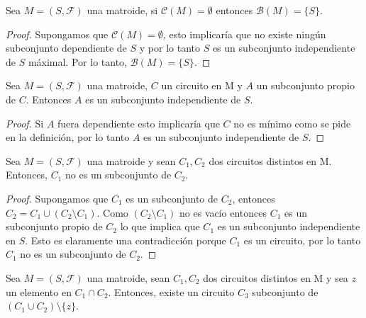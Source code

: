 \begin{cor}
Sea $M=(S,\mathcal{F})$ una matroide, si $\mathcal{C}(M)=\emptyset$ entonces $\mathcal{B}(M)=\{S\}$.
\end{cor}

\begin{proof}
Supongamos que $\mathcal{C}(M)=\emptyset$, esto implicaría que no existe ningún subconjunto dependiente de $S$ y por lo tanto $S$ es un subconjunto independiente de $S$ máximal. Por lo tanto, $\mathcal{B}(M)=\{S\}$.
\end{proof}

\begin{cor}
Sea $M=(S,\mathcal{F})$ una matroide, $C$ un circuito en M y $A$ un subconjunto propio de $C$. Entonces $A$ es un subconjunto independiente de $S$.
\end{cor}

\begin{proof}
Si $A$ fuera dependiente esto implicaría que $C$ no es mínimo como se pide en la definición, por lo tanto $A$ es un subconjunto independiente de $S$.
\end{proof}

\begin{cor} \label{C1}
Sea $M=(S,\mathcal{F})$ una matroide y sean $C_1, C_2$ dos circuitos distintos en M. Entonces, $C_1$ no es un subconjunto de $C_2$. 
\end{cor}

\begin{proof}
Supongamos que $C_1$ es un subconjunto de $C_2$, entonces $C_2=C_1 \cup (C_2 \setminus C_1)$. Como $(C_2 \setminus C_1)$ no es vacío entonces $C_1$ es un subconjunto propio de $C_2$ lo que implica que $C_1$ es un subconjunto independiente en $S$. Esto es claramente una contradicción porque $C_1$ es un circuito, por lo tanto $C_1$ no es un subconjunto de $C_2$.
\end{proof}

\begin{cor} \label{C2}
Sea $M=(S,\mathcal{F})$ una matroide, sean $C_1, C_2$ dos circuitos distintos en M y sea $z$ un elemento en $C_1 \cap C_2$. Entonces, existe un circuito $C_3$ subconjunto de $(C_1 \cup C_2)\setminus \{z\}$.
\end{cor}

